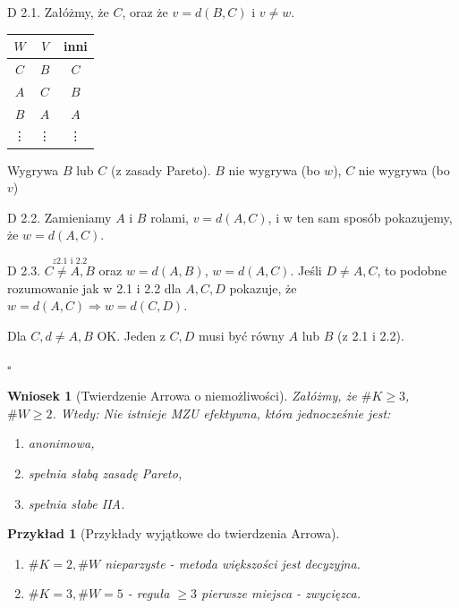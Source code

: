 \documentclass[12pt,a4paper]{article}
\theoremstyle{break}
\newtheorem{wniosek}{Wniosek}[theorem]
\newtheorem{example}{Przykład}[section]
\begin{document}
\begin{enumerate}[Dow. I)]
			D 2.1. Załóżmy, że $C$, oraz że $v = d(B,C)$ i $v \neq w$. 	
			\begin{tabular}{|c|c|c|}\hline
				$W$ & $V$ & inni \\\hline
				$C$ & $B$ & $C$ \\\hline
				$A$ & $C$ & $B$ \\\hline
				$B$ & $A$ & $A$ \\\hline
				\vdots & \vdots & \vdots \\\hline
			\end{tabular}
			
			Wygrywa $B$ lub $C$ (z zasady Pareto). $B$ nie wygrywa (bo $w$), $C$ nie wygrywa (bo $v$) \faBolt
			
			D 2.2. Zamieniamy $A$ i $B$ rolami, $v = d(A,C)$, i w ten sam sposób pokazujemy, że $w = d(A,C)$.
			
			D 2.3. $\overset{z 2.1 \text{ i } 2.2}{C \neq A,B}$ oraz $w = d(A,B)$, $w = d(A,C)$. Jeśli $D \neq A,C$, to podobne rozumowanie jak w 2.1 i 2.2 dla $A,C,D$ pokazuje, że $w = d(A,C) \Rightarrow w = d(C,D)$.
			
			Dla $C,d \neq A,B$ OK.
			Jeden z $C,D$ musi być równy $A$ lub $B$ (z 2.1 i 2.2).
			
		\end{enumerate}
	
\begin{flushright}$\square$\end{flushright}

\begin{wniosek}[Twierdzenie Arrowa o niemożliwości]
Załóżmy, że $\# K \geq 3$, $\# W \geq 2$.
Wtedy: Nie istnieje MZU efektywna, która jednocześnie jest:
\begin{enumerate}[-]
	\item anonimowa,
	\item spełnia słabą zasadę Pareto,
	\item spełnia słabe IIA.
\end{enumerate}
\end{wniosek}

\begin{example}[Przykłady wyjątkowe do twierdzenia Arrowa]
\begin{enumerate}[1.]
	\item $\# K = 2, \# W$ nieparzyste - metoda większości jest decyzyjna.
	\item $\# K = 3, \# W = 5$ - reguła $\geq 3$ pierwsze miejsca - zwycięzca.
\end{enumerate}
\end{example}
\end{document}

